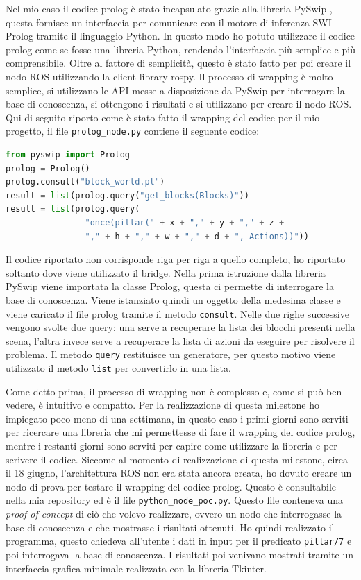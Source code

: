Nel mio caso il codice prolog è stato incapsulato grazie alla libreria PySwip \cite{pyswip}, questa fornisce un interfaccia per comunicare con il motore di inferenza SWI-Prolog tramite il linguaggio Python.
In questo modo ho potuto utilizzare il codice prolog come se fosse una libreria Python, rendendo l'interfaccia più semplice e più comprensibile. 
Oltre al fattore di semplicità, questo è stato fatto per poi creare il nodo ROS utilizzando la client library rospy.
Il processo di wrapping è molto semplice, si utilizzano le API messe a disposizione da PySwip per interrogare la base di conoscenza, si ottengono i risultati e si utilizzano per creare il nodo ROS.
Qui di seguito riporto come è stato fatto il wrapping del codice per il mio progetto, il file \verb+prolog_node.py+ contiene il seguente codice:
\begin{lstlisting}[language=Python]
from pyswip import Prolog
prolog = Prolog()
prolog.consult("block_world.pl")
result = list(prolog.query("get_blocks(Blocks)"))
result = list(prolog.query(
                "once(pillar(" + x + "," + y + "," + z + 
                "," + h + "," + w + "," + d + ", Actions))"))
\end{lstlisting}
Il codice riportato non corrisponde riga per riga a quello completo, ho riportato soltanto dove viene utilizzato il bridge. Nella prima istruzione dalla libreria PySwip viene importata la classe Prolog, questa ci permette di interrogare la base di conoscenza. Viene istanziato quindi un oggetto della medesima classe e viene caricato il file prolog tramite il metodo \verb+consult+.
Nelle due righe successive vengono svolte due query: una serve a recuperare la lista dei blocchi presenti nella scena, l'altra invece serve a recuperare la lista di azioni da eseguire per risolvere il problema. Il metodo \verb+query+ restituisce un generatore, per questo motivo viene utilizzato il metodo \verb+list+ per convertirlo in una lista. 

Come detto prima, il processo di wrapping non è complesso e, come si può ben vedere, è intuitivo e compatto. 
Per la realizzazione di questa milestone ho impiegato poco meno di una settimana, in questo caso i primi giorni sono serviti per ricercare una libreria che mi permettesse di fare il wrapping del codice prolog, mentre i restanti giorni sono serviti per capire come utilizzare la libreria e per scrivere il codice.
Siccome al momento di realizzazione di questa milestone, circa il 18 giugno, l'architettura ROS non era stata ancora creata, ho dovuto creare un nodo di prova per testare il wrapping del codice prolog. 
Questo è consultabile nella mia repository ed è il file \verb+python_node_poc.py+. Questo file conteneva una \textit{proof of concept} di ciò che volevo realizzare, ovvero un nodo che interrogasse la base di conoscenza e che mostrasse i risultati ottenuti. 
Ho quindi realizzato il programma, questo chiedeva all'utente i dati in input per il predicato \verb+pillar/7+ e poi interrogava la base di conoscenza. I risultati poi venivano mostrati tramite un interfaccia grafica minimale realizzata con la libreria Tkinter.

